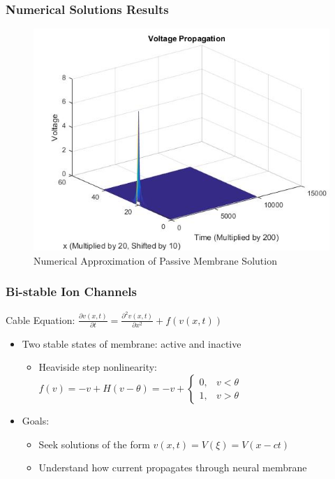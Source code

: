 \documentclass{beamer}
\begin{document}
\begin{frame}
\frametitle{Numerical Solutions Results}
\begin{figure}[H]
  \includegraphics[width=\linewidth]{Plot2.jpg}
  \caption{Numerical Approximation of Passive Membrane Solution}
  \label{fig:sketch2}
\end{figure}
\end{frame}


\begin{frame}
\frametitle{Bi-stable Ion Channels}
Cable Equation: $\frac{\partial v(x,t)}{\partial t}=\frac{\partial ^2 v(x,t)}{\partial x^2}+f(v(x,t))$ \\

\begin{itemize}
\item Two stable states of membrane: active and inactive
	\begin{itemize}
		\item Heaviside step nonlinearity: $f(v)=-v+H(v-\theta)=-v+
		\begin{cases}
    		0, & \text{$v<\theta$}\\
    		1, & \text{$v>\theta$}
  		\end{cases}$
	\end{itemize}
\item Goals: 
	\begin{itemize}
		\item Seek solutions of the form $v(x,t)=V(\xi)=V(x-ct)$
		\item Understand how current propagates through neural membrane
	\end{itemize}
\end{itemize}
\end{frame}
\end{document}

